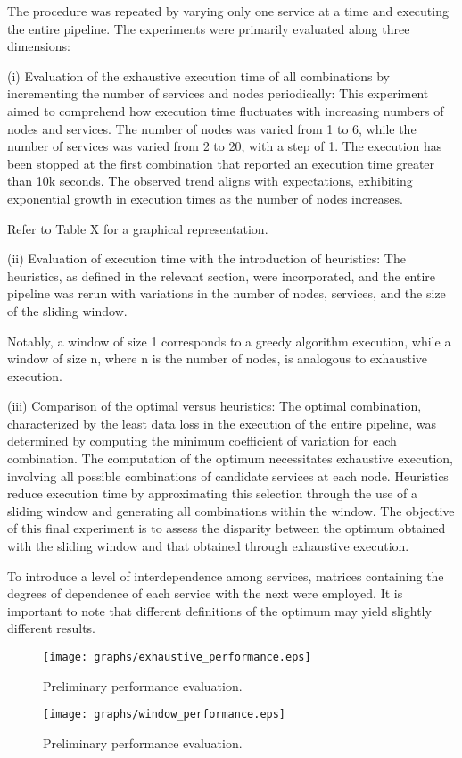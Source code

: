 The procedure was repeated by varying only one service at a time and executing the entire pipeline.
The experiments were primarily evaluated along three dimensions:

(i) Evaluation of the exhaustive execution time of all combinations by incrementing the number of services and nodes periodically:
This experiment aimed to comprehend how execution time fluctuates with increasing numbers of nodes and services.
The number of nodes was varied from 1 to 6, while the number of services was varied from 2 to 20, with a step of 1.
The execution has been stopped at the first combination that reported an execution time greater than 10k seconds.
The observed trend aligns with expectations, exhibiting exponential growth in execution times as the number of nodes increases.

Refer to Table X for a graphical representation.

(ii) Evaluation of execution time with the introduction of heuristics:
The heuristics, as defined in the relevant section, were incorporated,
and the entire pipeline was rerun with variations in the number of nodes,
services, and the size of the sliding window.

Notably, a window of size 1 corresponds to a greedy algorithm execution,
while a window of size n, where n is the number of nodes, is analogous to exhaustive execution.

(iii) Comparison of the optimal versus heuristics:
The optimal combination, characterized by the least data loss in the execution of the entire pipeline,
was determined by computing the minimum coefficient of variation for each combination.
The computation of the optimum necessitates exhaustive execution, involving all possible combinations of candidate services at each node.
Heuristics reduce execution time by approximating this selection through the use of a sliding window and generating all combinations within the window.
The objective of this final experiment is to assess the disparity between the optimum obtained with the sliding window and that obtained through exhaustive execution.

To introduce a level of interdependence among services,
matrices containing the degrees of dependence of each service with the next were employed.
It is important to note that different definitions of the optimum may yield slightly different results.

\begin{figure}
  \texttt{[image: graphs/exhaustive\_performance.eps]}
  \caption{Preliminary performance evaluation.}
  \label{fig:perf_exhaustive}
\end{figure}
\begin{figure*}
  \texttt{[image: graphs/window\_performance.eps]}
  \caption{Preliminary performance evaluation.}
  \label{fig:perf_window}
\end{figure*}



